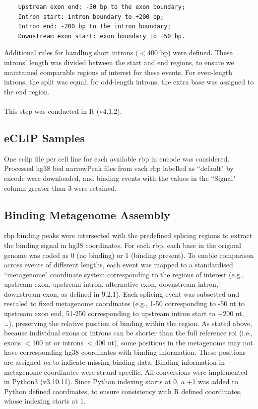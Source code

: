 \begin{verbatim}
	Upstream exon end: -50 bp to the exon boundary;
	Intron start: intron boundary to +200 bp;
	Intron end: -200 bp to the intron boundary;
	Downstream exon start: exon boundary to +50 bp.
\end{verbatim}
\noindent 
Additional rules for handling short introns ($<$400 bp) were defined. These introns' length was divided between the start and end regions, to ensure we maintained comparable regions of interest for these events. For even-length introns, the split was equal; for odd-length introns, the extra base was assigned to the end region. 
\\
\\
This step was conducted in R (v4.1.2).

\subsection{eCLIP Samples}

One \gls{eclip} file per cell line for each available \gls{rbp} in \gls{encode}\cite{the_encode_project_consortium_integrated_2012} was considered. Processed \gls{hg38} \gls{bed} narrowPeak files from each \gls{rbp} labelled as ``default" by \gls{encode}\cite{the_encode_project_consortium_integrated_2012} were downloaded, and binding events with the values in the ``Signal" column greater than 3 were retained.

\subsection{Binding Metagenome Assembly}

\gls{rbp} binding peaks were intersected with the predefined splicing regions to extract the binding signal in \gls{hg38} coordinates. For each \gls{rbp}, each base in the original genome was coded as 0 (no binding) or 1 (binding present). To enable comparison across events of different lengths, each event was mapped to a standardised ``metagenome" coordinate system corresponding to the regions of interest (e.g., upstream exon, upstream intron, alternative exon, downstream intron, downstream exon, as defined in 9.2.1). Each splicing event was subsetted and rescaled to fixed metagenome coordinates (e.g., 1-50 corresponding to -50 nt to upstream exon end, 51-250 corresponding to upstream intron start to +200 nt, …), preserving the relative position of binding within the region. As stated above, because individual exons or introns can be shorter than the full reference \gls{roi} (i.e., exons $<$100 nt or introns $<$400 nt), some positions in the metagenome may not have corresponding \gls{hg38} coordinates with binding information. These positions are assigned \textit{\gls{na}} to indicate missing binding data. Binding information in metagenome coordinates were strand-specific. All conversions were implemented in Python3 (v3.10.11). Since Python indexing starts at 0, a +1 was added to Python defined coordinates, to ensure consistency with R defined coordinates, whose indexing starts at 1.

